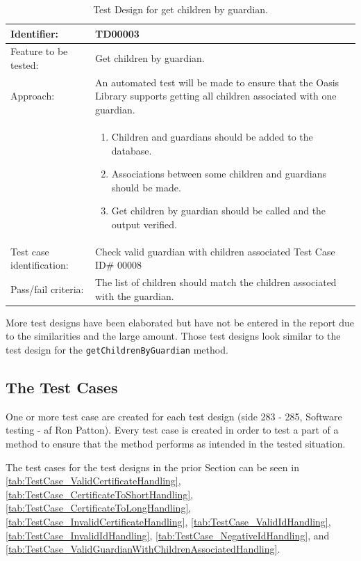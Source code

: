 \begin{table}[htbp]
	\centering
		\begin{tabular}{| p{4.5cm} | m{9cm} |}
			\hline
			Identifier: 				& TD00003 \\ \hline
			Feature to be tested:		& Get children by guardian. \\ \hline
			Approach:					& An automated test will be made to ensure that the Oasis Library supports getting all children associated with one guardian. \\
										&	\begin{enumerate}
												\item Children and guardians should be added to the database.
												\item Associations between some children and guardians should be made.
												\item Get children by guardian should be called and the output verified.
											\end{enumerate} \\ \hline
			Test case identification: 	& Check valid guardian with children associated Test Case ID\# 00008 \\ \hline
			Pass/fail criteria:			& The list of children should match the children associated with the guardian. \\ \hline
		\end{tabular}
	\caption{Test Design for get children by guardian.}
	\label{tab:TestDesign_GetChildrenByGuardian}
\end{table}

More test designs have been elaborated but have not be entered in the report due to the similarities and the large amount.
Those test designs look similar to the test design for the \texttt{getChildrenByGuardian} method.

\subsection{The Test Cases}
One or more test case are created for each test design (side 283 - 285, Software testing - af Ron Patton).
Every test case is created in order to test a part of a method to ensure that the method performs as intended in the tested situation.

The test cases for the test designs in the prior Section can be seen in 
\autoref{tab:TestCase_ValidCertificateHandling}, 
\autoref{tab:TestCase_CertificateToShortHandling},
\autoref{tab:TestCase_CertificateToLongHandling},
\autoref{tab:TestCase_InvalidCertificateHandling},
\autoref{tab:TestCase_ValidIdHandling},
\autoref{tab:TestCase_InvalidIdHandling},
\autoref{tab:TestCase_NegativeIdHandling}, 
and \autoref{tab:TestCase_ValidGuardianWithChildrenAssociatedHandling}.

